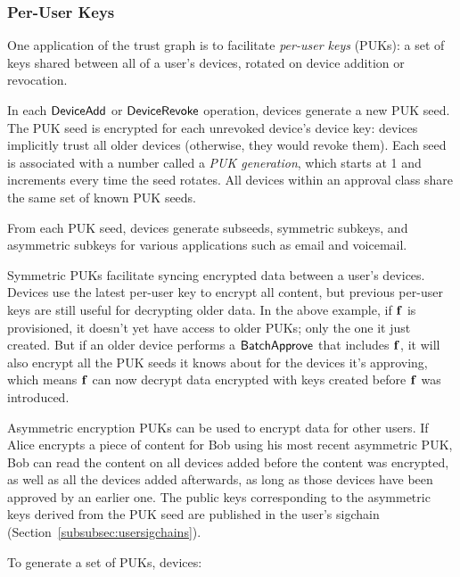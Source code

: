 \subsubsection{Per-User Keys}\label{subsubsec:puks} One application of the trust graph is to
facilitate \textit{per-user keys} (PUKs): a set of keys shared between all of a user's devices,
rotated on device addition or revocation.

In each $\mathsf{DeviceAdd}{}$ or $\mathsf{DeviceRevoke}{}$ operation, devices generate a new PUK seed. The PUK seed
is encrypted for each unrevoked device's device key: devices implicitly trust all older devices
(otherwise, they would revoke them). Each seed is associated with a number called a \textit{PUK
generation}, which starts at 1 and increments every time the seed rotates. All devices within an
approval class share the same set of known PUK seeds.

From each PUK seed, devices generate subseeds, symmetric subkeys, and asymmetric subkeys for various
applications such as email and voicemail.

Symmetric PUKs facilitate syncing encrypted data between a user's devices. Devices use the latest
per-user key to encrypt all content, but previous per-user keys are still useful for decrypting
older data. In the above example, if $\mathbf{f}$ is provisioned, it doesn't yet have access to older
PUKs; only the one it just created. But if an older device performs a $\mathsf{BatchApprove}{}$ that
includes $\mathbf{f}$, it will also encrypt all the PUK seeds it knows about for the devices it's
approving, which means $\mathbf{f}$ can now decrypt data encrypted with keys created before $\mathbf{f}$
was introduced.

Asymmetric encryption PUKs can be used to encrypt data for other users. If Alice encrypts a piece of
content for Bob using his most recent asymmetric PUK, Bob can read the content on all devices added
before the content was encrypted, as well as all the devices added afterwards, as long as those
devices have been approved by an earlier one. The public keys corresponding to the asymmetric keys
derived from the PUK seed are published in the user's sigchain
(Section~\ref{subsubsec:usersigchains}).

To generate a set of PUKs, devices:

